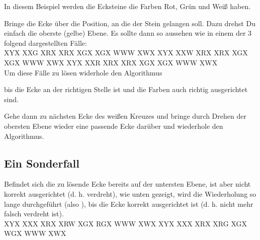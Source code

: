 In diesem Beispiel werden die Ecksteine die Farben Rot, Grün und Weiß haben.

Bringe die Ecke über die Position, an die der Stein gelangen soll. Dazu drehst
Du einfach die oberste (gelbe) Ebene. Es sollte dann so aussehen wie in einem der 3
folgend dargestellten Fälle: \\[1em]

\RubikCubeGreyAll%
            {X}{Y}{X}
            {X}{X}{G}%
               {X}{R}{X}
	       {X}{R}{X}%
	       {X}{G}{X}
	       {X}{G}{X}%
	      {W}{W}{W}
	      {X}{W}{X}%
%
\RubikCubeGreyAll%
            {X}{Y}{X}
            {X}{X}{W}%
               {X}{R}{X}
	       {X}{R}{X}%
	       {X}{G}{X}
	       {X}{G}{X}%
	      {W}{W}{W}
	      {X}{W}{X}%
%
\RubikCubeGreyAll%
            {X}{Y}{X}
            {X}{X}{R}%
               {X}{R}{X}
	       {X}{R}{X}%
	       {X}{G}{X}
	       {X}{G}{X}%
	      {W}{W}{W}
	      {X}{W}{X}%
\\[1em]
Um diese Fälle zu lösen widerhole den Algorithmus
\begin{center}
\end{center}
bis die Ecke an der richtigen Stelle ist und die Farben auch richtig
ausgerichtet sind.

Gehe dann zu nächsten Ecke des weißen Kreuzes und bringe durch Drehen der
obersten Ebene wieder eine passende Ecke darüber und wiederhole den Algorithmus.

\subsection{Ein Sonderfall}
Befindet sich die zu lösende Ecke bereits auf der untersten Ebene, ist aber
nicht korrekt ausgerichtet (d. h. verdreht), wie unten gezeigt, wird die
Wiederholung so lange durchgeführt (also ), bis die Ecke korrekt
ausgerichtet ist (d. h. nicht mehr falsch verdreht ist).\\[1em]

\RubikCubeGreyAll%
            {X}{Y}{X}
            {X}{X}{X}%
               {X}{R}{X}
	       {X}{R}{W}%
	       {X}{G}{X}
	       {R}{G}{X}%
	      {W}{W}{W}
	      {X}{W}{X}%
%
\RubikCubeGreyAll%
            {X}{Y}{X}
            {X}{X}{X}%
               {X}{R}{X}
	       {X}{R}{G}%
	       {X}{G}{X}
	       {W}{G}{X}%
	      {W}{W}{W}
	      {X}{W}{X}%


